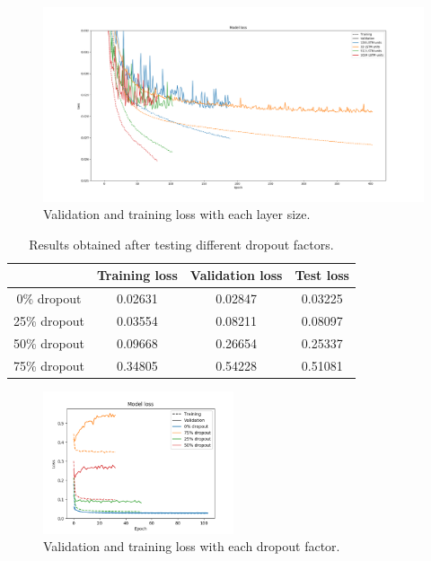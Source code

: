 \documentclass[]{article}
\begin{document}
	\begin{figure}[H]
		\centering
		\includegraphics[width=\textwidth]{sites_1}
		\caption{Validation and training loss with each layer size.}
		\label{f:sites_1}
	\end{figure}
	
	\begin{table}[H]
		\centering
		\begin{tabular}{@{}cccc@{}}
			\toprule
			& Training loss & Validation loss & Test loss \\ \midrule
			0\% dropout  & 0.02631       & 0.02847         & 0.03225   \\
			25\% dropout & 0.03554       & 0.08211         & 0.08097   \\
			50\% dropout & 0.09668       & 0.26654         & 0.25337   \\
			75\% dropout & 0.34805       & 0.54228         & 0.51081   \\ \bottomrule
		\end{tabular}
		\caption{Results obtained after testing different dropout factors.}
		\label{t:sites_2}
	\end{table}
	
	\begin{figure}[H]
		\centering
		\includegraphics[width=0.5\textwidth]{sites_2}
		\caption{Validation and training loss with each dropout factor.}
		\label{f:sites_2}
	\end{figure}
	
\end{document}
